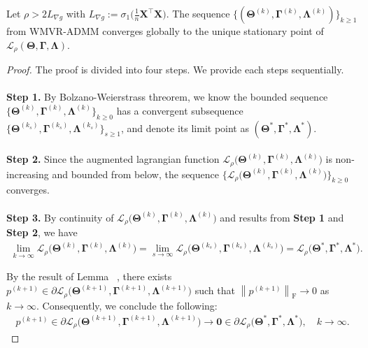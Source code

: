 \documentclass[alpha-refs]{wiley-article}
\begin{document}
\newpage
\begin{theorem} \label{convergence}
    Let $\rho>2L_{\nabla g}$ with $L_{\nabla g}:=\sigma_{1}\big( \frac{1}{n}\boldsymbol{X}^{\top}\boldsymbol{X}\big)$.
    The sequence $\{(\boldsymbol{\Theta}^{(k)},\boldsymbol{\Gamma}^{(k)},\boldsymbol{\Lambda}^{(k)})\}_{k \geq 1}$ from WMVR-ADMM
    converges globally to the unique stationary point of $\mathcal{L}_{\rho}(\boldsymbol{\Theta},\boldsymbol{\Gamma},\boldsymbol{\Lambda})$.
\end{theorem}
\begin{proof}
The proof is divided into four steps. We provide each steps sequentially.\\ \\
{\textbf{Step 1.}}
By Bolzano-Weierstrass threorem, we know the bounded sequence $\{\boldsymbol{\Theta}^{(k)},\boldsymbol{\Gamma}^{(k)},\boldsymbol{\Lambda}^{(k)}\}_{k \geq 0}$ has a convergent subsequence
$\{\boldsymbol{\Theta}^{(k_{s})},\boldsymbol{\Gamma}^{(k_{s})},\boldsymbol{\Lambda}^{(k_{s})}\}_{s \geq 1}$, and denote its limit point as $(\boldsymbol{\Theta}^{*},\boldsymbol{\Gamma}^{*},\boldsymbol{\Lambda}^{*})$.
\\ \\
{\textbf{Step 2.}}
Since the augmented lagrangian function $\mathcal{L}_{\rho} \big( \boldsymbol{\Theta}^{(k)},\boldsymbol{\Gamma}^{(k)},\boldsymbol{\Lambda}^{(k)} \big)$ is non-increasing and bounded from below,
the sequence $\{\mathcal{L}_{\rho} \big( \boldsymbol{\Theta}^{(k)},\boldsymbol{\Gamma}^{(k)},\boldsymbol{\Lambda}^{(k)} \big)\}_{k \geq 0}$ converges.
\\ \\
{\textbf{Step 3.}}
By continuity of $\mathcal{L}_{\rho} \big( \boldsymbol{\Theta}^{(k)},\boldsymbol{\Gamma}^{(k)},\boldsymbol{\Lambda}^{(k)} \big)$ and results from \textbf{Step 1} and \textbf{Step 2}, we have
\begin{align*}
    \lim_{k\rightarrow{\infty}} \mathcal{L}_{\rho} \big( \boldsymbol{\Theta}^{(k)},\boldsymbol{\Gamma}^{(k)},\boldsymbol{\Lambda}^{(k)} \big)
    = \lim_{s\rightarrow{\infty}} \mathcal{L}_{\rho} \big( \boldsymbol{\Theta}^{(k_{s})},\boldsymbol{\Gamma}^{(k_{s})},\boldsymbol{\Lambda}^{(k_{s})} \big)
    = \mathcal{L}_{\rho} \big( \boldsymbol{\Theta}^{*},\boldsymbol{\Gamma}^{*},\boldsymbol{\Lambda}^{*} \big).
\end{align*}

By the result of Lemma ~, there exists $p^{(k+1)}\in\partial \mathcal{L}_{\rho} \big( \boldsymbol{\Theta}^{(k+1)},\boldsymbol{\Gamma}^{(k+1)},\boldsymbol{\Lambda}^{(k+1)} \big)$ such that $\left\|p^{(k+1)}\right\|_{\text{F}}\rightarrow{0}$ as $k\rightarrow{\infty}$.
Consequently, we conclude the following:
\begin{align*}
    p^{(k+1)}\in\partial \mathcal{L}_{\rho} \big( \boldsymbol{\Theta}^{(k+1)},\boldsymbol{\Gamma}^{(k+1)},\boldsymbol{\Lambda}^{(k+1)} \big) \rightarrow{ \boldsymbol{0}\in\partial \mathcal{L}_{\rho} \big( \boldsymbol{\Theta}^{*},\boldsymbol{\Gamma}^{*},\boldsymbol{\Lambda}^{*} \big)}, \quad
    k\rightarrow{\infty}.
\end{align*}


\end{proof}
\end{document}
